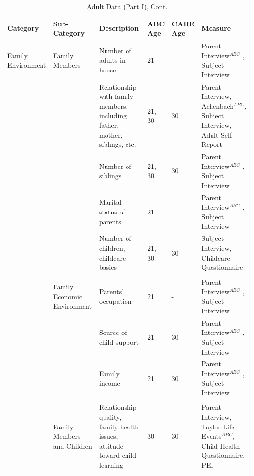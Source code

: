 \documentclass[static]{JJH-Beamer}
\begin{document}
\begin{frame}

\begin{table}[H]
\addtocounter{table}{-1}
\caption{Adult Data (Part I), Cont.}						
\begin{center}
\begin{tiny}						
\begin{tabular}{L{1.2cm} C{1.4cm} C{2.5cm} C{.8cm} C{.8cm} C{2.9cm}}										
\toprule
\textbf{Category}	&	\textbf{Sub-Category}	&	\textbf{Description}	&	\textbf{ABC Age}  	&  \textbf{CARE Age}  & 	\textbf{Measure}	\\ \midrule																
Family Environment      	&	       Family Members  	&	       Number of adults in house       	&	21	&	-	&	       Parent Interview$^{ABC}$ , Subject Interview    \\
        	&	               	&	       Relationship with family members, including father, mother, siblings, etc.      	&	       21, 30  	&	30	&	      Parent Interview, Achenbach$^{ABC}$, Subject Interview, Adult Self Report \\
        	&	               	&	       Number of siblings      	&	       21, 30  	&	30	&	       Parent Interview$^{ABC}$ , Subject Interview    \\
        	&	               	&	       Marital status of parents       	&	21	&	-	&	       Parent Interview$^{ABC}$ , Subject Interview    \\
        	&	               	&	       Number of children, childcare basics    	&	       21, 30  	&	30	&	       Subject Interview, Childcare Questionnaire      \\
\\										
        	&	       Family Economic Environment     	&	       Parents' occupation     	&	21	&	-	&	       Parent Interview$^{ABC}$ , Subject Interview    \\
        	&	               	&	       Source of child support 	&	21	&	30	&	       Parent Interview$^{ABC}$ , Subject Interview    \\
        	&	               	&	       Family income   	&	21	&	30	&	       Parent Interview$^{ABC}$ , Subject Interview    \\
\\										
        	&	       Family Members and Children	&	Relationship quality, family health issues, attitude toward child learning	&	30	&	30	&	       Parent Interview, Taylor Life Events$^{ABC}$, Child Health Questionnaire, PEI    \\
\bottomrule							
\end{tabular}										
\end{tiny}
\end{center}							
\end{table}

\end{frame}
\end{document}
